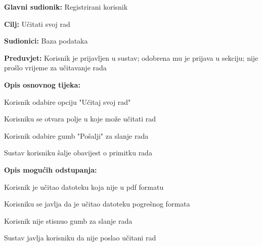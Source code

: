 	\noindent {}
	\begin{packed_item}
		
		\item \textbf{Glavni sudionik: }Registrirani korisnik
		\item  \textbf{Cilj:} Učitati svoj rad
		\item  \textbf{Sudionici:} Baza podataka
		\item  \textbf{Preduvjet:} Korisnik je prijavljen u sustav; odobrena mu je prijava u sekciju; nije prošlo vrijeme za učitavanje rada
		\item  \textbf{Opis osnovnog tijeka:}
		
		\item[] \begin{packed_enum}
			
			\item  Korisnik odabire opciju "Učitaj svoj rad"
			\item Korisniku se otvara polje u koje može učitati rad
			\item Korisnik odabire gumb "Pošalji" za slanje rada
			\item Sustav korisniku šalje obavijest o primitku rada
			
		\end{packed_enum}
		
		\item  \textbf{Opis mogućih odstupanja:}
		
		\item[] \begin{packed_item}
			
			\item[2.a] Korisnik je učitao datoteku koja nije u pdf formatu
			\item[] \begin{packed_enum} 
				\item Korisniku se javlja da je učitao datoteku pogrešnog formata
					\end{packed_enum}
				
			\item[2.b] Korisnik nije stisnuo gumb za slanje rada
			\item[] \begin{packed_enum}
				\item Sustav javlja korisniku da nije poslao učitani rad
				
			\end{packed_enum}
		\end{packed_item}
	\end{packed_item}

